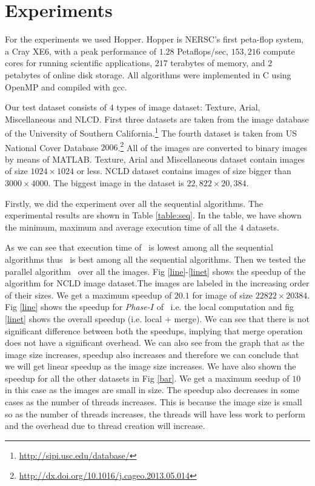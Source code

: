 \section{Experiments}
\label{sec:experiments}



For the experiments we used Hopper. Hopper is NERSC's first peta-flop system, a
Cray XE6, with a peak performance of $1.28$ Petaflops/sec, $153,216$ compute
cores for running scientific applications, $217$ terabytes of memory, and $2$
petabytes of online disk storage. All algorithms were implemented in C using OpenMP and compiled with gcc.

Our test dataset consists of $4$ types of image dataset: Texture, Arial,
Miscellaneous and NLCD. First three datasets are taken from the image database of the University of 
Southern
California.\footnote{\url{http://sipi.usc.edu/database/}} 
The fourth dataset is taken from US National Cover Database
$2006$.\footnote{\url{http://dx.doi.org/10.1016/j.cageo.2013.05.014}} All of the
images are converted to binary images by means of MATLAB.
Texture, Arial and Miscellaneous dataset contain images of size $1024 \times
1024$ or less.
NCLD dataset contains images of size bigger than $3000 \times
4000$. The biggest image in the dataset is $22,822 \times 20,384$.

Firstly, we did the experiment over all the sequential algorithms. The
experimental results are shown in Table \ref{table:seq}. In the table, we have
shown the minimum, maximum and average execution time of all the $4$ datasets. 

As we can see that execution time of \aremsp\ is lowest among all
the sequential algorithms thus \aremsp\ is best among all the sequential
algorithms.
Then we tested the parallel algorithm \paremsp\ over all the images.
Fig \ref{line}-\ref{linet} shows the speedup of the algorithm for 
NCLD image dataset.The images are labeled in the increasing order of their
sizes. We get a maximum speedup of $20.1$ for image of size $22822 \times 20384$.
Fig \ref{line} shows the speedup for {\em Phase-$I$} of \paremsp\ i.e. 
the local computation and fig \ref{linet} shows the overall speedup (i.e. local + merge). We can see that there is not 
significant difference between both the speedups, implying that merge operation
does not have a significant overhead. 
We can also see from the graph that as the image size increases, speedup also
increases and therefore we can conclude that we will get linear speedup as the
image size increases. We have also shown the speedup for all the other datasets
in Fig \ref{bar}.
We get a maximum seedup of $10$ in this case as the images are small in size.
The speedup also decreases in some cases as the number of threads increases.
This is because the image size is small so as the number of threads increases,
the threads will have less work to perform and the overhead due to thread
creation will increase.


